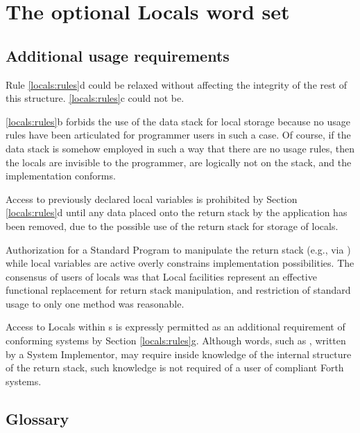 

\section{The optional Locals word set} %
\label{rat:local}

\setcounter{subsection}{2}
\subsection{Additional usage requirements} %

Rule \ref{locals:rules}d could be relaxed without affecting the
integrity of the rest of this structure. \ref{locals:rules}c could
not be.

\ref{locals:rules}b forbids the use of the data stack for local
storage because no usage rules have been articulated for programmer
users in such a case. Of course, if the data stack is somehow employed
in such a way that there are no usage rules, then the locals are
invisible to the programmer, are logically not on the stack, and the
implementation conforms.

Access to previously declared local variables is prohibited by Section
\ref{locals:rules}d until any data placed onto the return stack by the
application has been removed, due to the possible use of the return
stack for storage of locals.

Authorization for a Standard Program to manipulate the return stack
(e.g., via  ) while local variables
are active overly constrains implementation possibilities. The consensus
of users of locals was that Local facilities represent an effective
functional replacement for return stack manipulation, and restriction
of standard usage to only one method was reasonable.

Access to Locals within s is
expressly permitted as an additional requirement of conforming systems
by Section \ref{locals:rules}g. Although words, such as ,
written by a System Implementor, may require inside knowledge of the
internal structure of the return stack, such knowledge is not required
of a user of compliant Forth systems.

\setcounter{subsection}{5}
\subsection{Glossary} %

